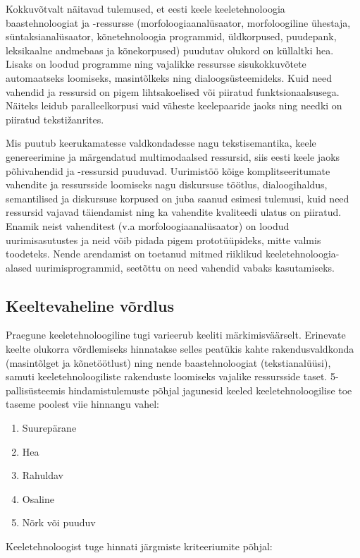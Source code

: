 \begin{multicols}{2}
Kokkuvõtvalt näitavad tulemused, et eesti keele keeletehnoloogia baastehnoloogiat ja -ressursse (morfoloogiaanalüsaator, morfoloogiline ühestaja, süntaksianalüsaator, kõnetehnoloogia programmid, üldkorpused, puudepank, leksikaalne andmebaas ja kõnekorpused) puudutav olukord on küllaltki hea. 
Lisaks on loodud programme ning vajalikke ressursse sisukokkuvõtete automaatseks loomiseks, masintõlkeks ning dialoogsüsteemideks. 
Kuid need vahendid ja ressursid on pigem lihtsakoelised või piiratud funktsionaalsusega. 
Näiteks leidub paralleelkorpusi vaid väheste keelepaaride jaoks ning needki on piiratud tekstižanrites. 

Mis puutub keerukamatesse valdkondadesse nagu tekstisemantika, keele genereerimine ja märgendatud multimodaalsed ressursid, siis eesti keele jaoks põhivahendid ja -ressursid puuduvad. 
Uurimistöö kõige komplitseeritumate vahendite ja ressursside loomiseks nagu diskursuse töötlus, dialoogihaldus, semantilised ja diskursuse korpused on juba saanud esimesi tulemusi, kuid need ressursid vajavad täiendamist ning ka vahendite kvaliteedi ulatus on piiratud. 
Enamik neist vahenditest (v.a morfoloogiaanalüsaator) on loodud uurimisasutustes ja neid võib pidada pigem prototüüpideks, mitte valmis toodeteks. 
Nende arendamist on toetanud mitmed riiklikud keeletehnoloogia-alased uurimisprogrammid, seetõttu on need vahendid vabaks kasutamiseks. 


\subsection{Keeltevaheline võrdlus}

Praegune keeletehnoloogiline tugi varieerub keeliti märkimisväärselt. 
Erinevate keelte olukorra võrdlemiseks hinnatakse selles peatükis kahte rakendusvaldkonda (masintõlget ja kõnetöötlust) ning nende baastehnoloogiat (tekstianalüüsi), samuti keeletehnoloogiliste rakenduste loomiseks vajalike ressursside taset. 5-pallisüsteemis hindamistulemuste põhjal jagunesid keeled keeletehnoloogilise toe taseme poolest viie hinnangu vahel:

\begin{enumerate}
\item Suurepärane
\item Hea
\item Rahuldav
\item Osaline
\item Nõrk või puuduv
\end{enumerate}

Keeletehnoloogist tuge hinnati järgmiste kriteeriumite põhjal:


\end{multicols}
